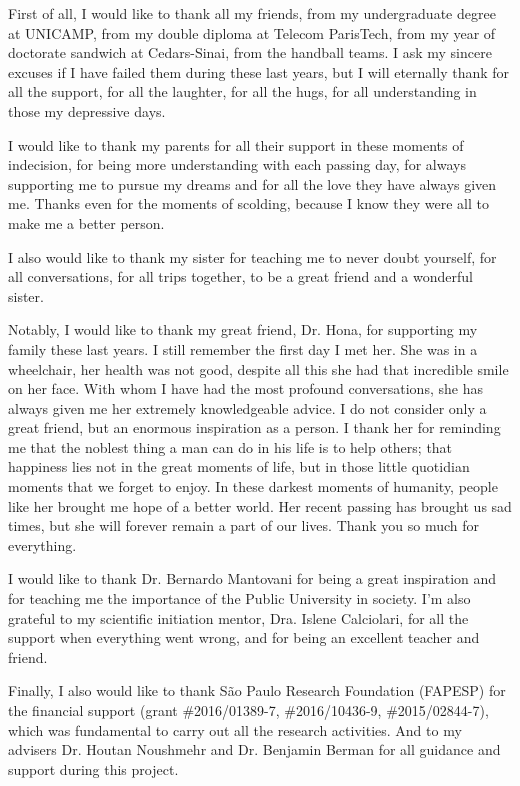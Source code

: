 

First of all, I would like to thank all my friends, from my undergraduate degree at UNICAMP, from my double diploma at Telecom ParisTech, from my year of doctorate sandwich at Cedars-Sinai, from the handball teams. I ask my sincere excuses if I have failed them during these last years, but I will eternally thank for all the support, for all the laughter, for all the hugs, for all understanding in those my depressive days.

I would like to thank my parents for all their support in these moments of indecision, for being more understanding with each passing day, for always supporting me to pursue my dreams and for all the love they have always given me. Thanks even for the moments of scolding, because I know they were all to make me a better person.

I also would like to thank my sister for teaching me to never doubt yourself,
for all conversations, for all trips together, to be a great friend and a wonderful sister.

Notably, I would like to thank my great friend, Dr. Hona, for supporting my family these last years.
I still remember the first day I met her. She was in a wheelchair, her health was not good, despite all this she had that incredible smile on her face. With whom I have had the most  profound conversations, she has always given me her extremely knowledgeable advice. I do not consider only a great friend, but an enormous inspiration as a person. I thank her for reminding me that the noblest thing a man can do in his life is to help others; that happiness lies not in the great moments of life, but in those little quotidian moments that we forget to enjoy. In these darkest moments of humanity, people like her brought me hope of a better world. Her recent passing has brought us sad times, but she will forever remain a part of our lives. Thank you so much for everything.

I would like to thank  Dr. Bernardo Mantovani for being a great inspiration and for teaching me the importance of the Public University in society. I'm also grateful to my scientific initiation mentor, Dra. Islene Calciolari, for all the support when everything went wrong, and for being an excellent teacher and friend.

Finally, I also would like to thank S\~{a}o Paulo Research Foundation (FAPESP) for the financial support 
(grant \#2016/01389-7, \#2016/10436-9, \#2015/02844-7),
which was fundamental to carry out all the research activities.
And to my advisers Dr. Houtan Noushmehr and Dr. Benjamin Berman
for all guidance and support during this project.\\
